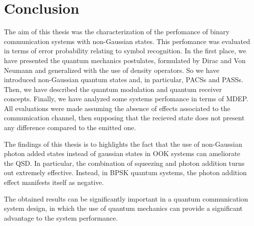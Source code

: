 
\chapter{Conclusion}
    The aim of this thesis was the characterization of the perfomance of binary communication systems with
    non-Gaussian states. This perfomance was evaluated in terms of error probability 
    relating to symbol recognition. 
    In the first place, we have presented the quantum mechanics postulates, formulated by Dirac and 
    Von Neumann and generalized with the use of density operators. So we have introduced non-Gaussian
    quantum states and, in particular, PACSs and PASSs.
    Then, we have described the quantum modulation and quantum receiver concepts. 
    Finally, we have analyzed some systems perfomance in terms of MDEP.
    All evaluations were made assuming the absence of effects associated to the communication channel, 
    then supposing that the recieved state does not present any difference compared to the emitted one.
    
    The findings of this thesis is to highlights the fact that the use of non-Gaussian photon added states 
    instead of gaussian states in OOK systems can ameliorate the QSD.
    In particular, the combination of squeezing and photon addition turns out extremely effective.
    Instead, in BPSK quantum systems, the photon addition effect manifests itself as negative.

    The obtained results can be significantly important in a quantum communication system design, 
    in which the use of quantum mechanics can provide a significant advantage to the system performance. 